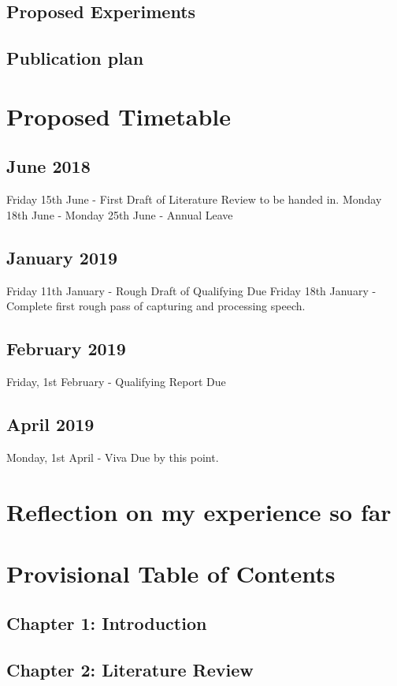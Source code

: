 \documentclass{article}
\begin{document}
	\subsection{Proposed Experiments}
	\subsection{Publication plan}
	
	\section{Proposed Timetable}
	
	\subsection{June 2018}
	Friday 15th June - First Draft of Literature Review to be handed in.
	\newline
	Monday 18th June - Monday 25th June - Annual Leave
	\subsection{January 2019}
	Friday 11th January - Rough Draft of Qualifying Due
	Friday 18th January - Complete first rough pass of capturing and processing speech.
	
	\subsection{February 2019}
	Friday, 1st February - Qualifying Report Due
	\subsection{April 2019}
	Monday, 1st April - Viva Due by this point.
	
	\section{Reflection on my experience so far}
	
	\section{Provisional Table of Contents}
	\subsection{Chapter 1: Introduction}
	\subsection{Chapter 2: Literature Review}
\end{document}

